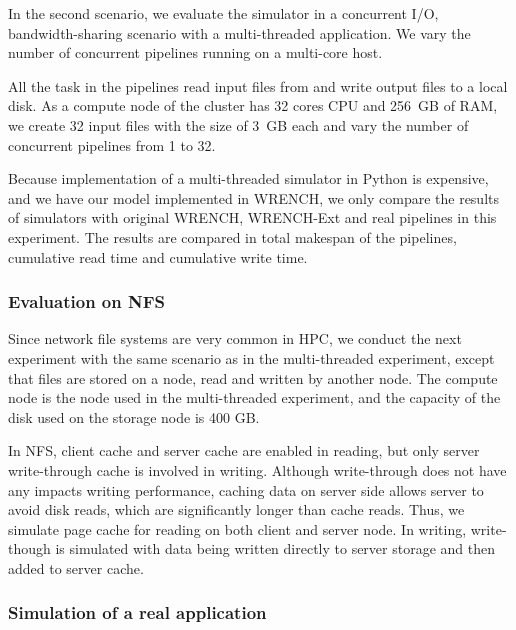 \documentclass[conference]{IEEEtran}
\begin{document}
            In the second scenario, we evaluate the simulator in a concurrent I/O, 
            bandwidth-sharing scenario with a multi-threaded application.             
            We vary the number of concurrent pipelines running on a multi-core host.  
            
            All the task in the pipelines read input files from and write output files 
            to a local disk. 
            As a compute node of the cluster has 32 cores CPU and 256~GB of RAM,  
            we create 32 input files with the size of 3~GB each and vary the number of 
            concurrent pipelines from 1 to 32. 
            
            Because implementation of a multi-threaded simulator in Python is 
            expensive, and we have our model implemented in WRENCH, 
            we only compare the results of simulators with original WRENCH, 
            WRENCH-Ext and real pipelines in this experiment. 
            The results are compared in total makespan of the pipelines, 
            cumulative read time and cumulative write time.
            
            \subsubsection{Evaluation on NFS}
            
            Since network file systems are very common in HPC, we conduct 
            the next experiment with the same scenario as in the multi-threaded experiment, 
            except that files are stored on a node, read and written by another node. 
            The compute node is the node used in the multi-threaded experiment, 
            and the capacity of the disk used on the storage node is 400 GB.
            
            In NFS, client cache and server cache are enabled in reading, but only 
            server write-through cache is involved in writing. 
            Although write-through does not have any impacts writing performance, 
            caching data on server side allows server to avoid disk reads, which are 
            significantly longer than cache reads.
            Thus, we simulate page cache for reading on both client and server node.
            In writing, write-though is simulated with data being written directly to 
            server storage and then added to server cache. 
            
            \subsubsection{Simulation of a real application}
\end{document}

